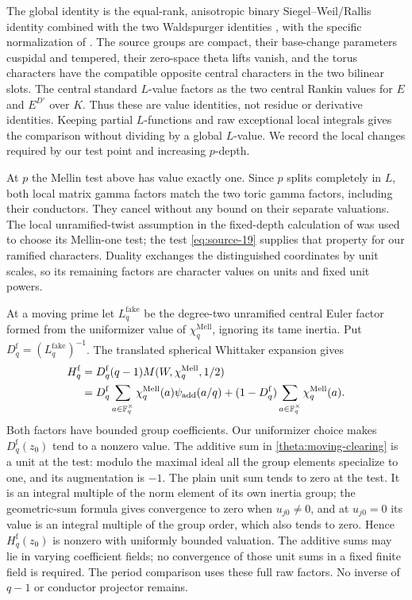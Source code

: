 The global identity is the equal-rank, anisotropic binary
Siegel--Weil/Rallis identity \cite{Yamana,GanQiuTakeda} combined
with the two Waldspurger identities \cite{Waldspurger}, with the
specific normalization of \cite[Equation (5.6)]{C}.
The source groups are
compact, their base-change parameters cuspidal and tempered, their
zero-space theta lifts vanish, and the torus characters have the
compatible opposite central characters in the two bilinear slots.
The central standard $L$-value factors as the two central Rankin
values for $E$ and $E^{D'}$ over $K$.  Thus these are value
identities, not residue or derivative identities.  Keeping partial
$L$-functions and raw exceptional local integrals gives the
comparison without dividing by a global $L$-value.  We record the
local changes required by our test point and increasing $p$-depth.

At $p$ the Mellin test above has value exactly one.  Since $p$ splits
completely in $L$, both local matrix gamma factors match the two
toric gamma factors, including their conductors.  They cancel
without any bound on their separate valuations.  The local
unramified-twist assumption in the fixed-depth calculation of
\cite[Section 5]{C} was used to choose its Mellin-one test; the test
\eqref{eq:source-19} supplies that property for our ramified
characters.  Duality exchanges the distinguished coordinates by
unit scales, so its remaining factors are character values on
units and fixed unit powers.

At a moving prime let $L_q^{\mathrm{fake}}$ be the degree-two
unramified central Euler factor formed from the uniformizer value
of $\chi_q^{\mathrm{Mell}}$, ignoring its tame inertia.  Put
$D_q^{\mathrm f}=(L_q^{\mathrm{fake}})^{-1}$.  The translated
spherical Whittaker expansion gives
\begin{equation}\label{theta:moving-clearing}
 \begin{split}
 H_q^{\mathrm f}
 &=D_q^{\mathrm f}(q-1)M(W,\chi_q^{\mathrm{Mell}},1/2)\\
 &=D_q^{\mathrm f}
      \sum_{a\in\mathbb F_q^\times}\chi_q^{\mathrm{Mell}}(a)
                    \psi_{\mathrm{add}}(a/q)
   +(1-D_q^{\mathrm f})
      \sum_{a\in\mathbb F_q^\times}\chi_q^{\mathrm{Mell}}(a).
 \end{split}
\end{equation}
Both factors have bounded group coefficients.  Our uniformizer
choice makes $D_q^{\mathrm f}(z_0)$ tend to a nonzero value.
The additive sum in \eqref{theta:moving-clearing} is a unit at the
test: modulo the maximal ideal all the group elements specialize
to one, and its augmentation is $-1$.  The plain unit sum tends
to zero at the test.  It is an integral multiple of the norm
element of its own inertia group; the geometric-sum formula gives
convergence to zero when $u_{j0}\ne0$, and at $u_{j0}=0$ its value
is an integral multiple of the group order, which also tends to
zero.  Hence
$H_q^{\mathrm f}(z_0)$ is nonzero with uniformly bounded valuation.
The additive sums may lie in varying coefficient fields; no
convergence of those unit sums in a fixed finite field is required.
The period comparison uses these full raw factors.  No inverse
of $q-1$ or conductor projector remains.


